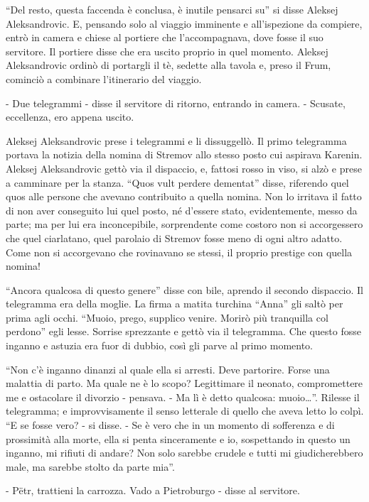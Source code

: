 ``Del resto, questa faccenda è conclusa, è inutile pensarci su'' si disse Aleksej Aleksandrovic. E, pensando solo al viaggio imminente e all'ispezione da compiere, entrò in camera e chiese al portiere che l'accompagnava, dove fosse il suo servitore. Il portiere disse che era uscito proprio in quel momento. Aleksej Aleksandrovic ordinò di portargli il tè, sedette alla tavola e, preso il Frum, cominciò a combinare l'itinerario del viaggio. 

- Due telegrammi - disse il servitore di ritorno, entrando in camera. - Scusate, eccellenza, ero appena uscito. 

Aleksej Aleksandrovic prese i telegrammi e li dissuggellò. Il primo telegramma portava la notizia della nomina di Stremov allo stesso posto cui aspirava Karenin. Aleksej Aleksandrovic gettò via il dispaccio, e, fattosi rosso in viso, si alzò e prese a camminare per la stanza. ``Quos vult perdere dementat'' disse, riferendo quel quos alle persone che avevano contribuito a quella nomina. Non lo irritava il fatto di non aver conseguito lui quel posto, né d'essere stato, evidentemente, messo da parte; ma per lui era inconcepibile, sorprendente come costoro non si accorgessero che quel ciarlatano, quel parolaio di Stremov fosse meno di ogni altro adatto. Come non si accorgevano che rovinavano se stessi, il proprio prestige con quella nomina! 

``Ancora qualcosa di questo genere'' disse con bile, aprendo il secondo dispaccio. Il telegramma era della moglie. La firma a matita turchina ``Anna'' gli saltò per prima agli occhi. ``Muoio, prego, supplico venire. Morirò più tranquilla col perdono'' egli lesse. Sorrise sprezzante e gettò via il telegramma. Che questo fosse inganno e astuzia era fuor di dubbio, così gli parve al primo momento. 

``Non c'è inganno dinanzi al quale ella si arresti. Deve partorire. Forse una malattia di parto. Ma quale ne è lo scopo? Legittimare il neonato, compromettere me e ostacolare il divorzio - pensava. - Ma lì è detto qualcosa: muoio\ldots{}''. Rilesse il telegramma; e improvvisamente il senso letterale di quello che aveva letto lo colpì. ``E se fosse vero? - si disse. - Se è vero che in un momento di sofferenza e di prossimità alla morte, ella si penta sinceramente e io, sospettando in questo un inganno, mi rifiuti di andare? Non solo sarebbe crudele e tutti mi giudicherebbero male, ma sarebbe stolto da parte mia''. 

- Pëtr, trattieni la carrozza. Vado a Pietroburgo - disse al servitore. 

